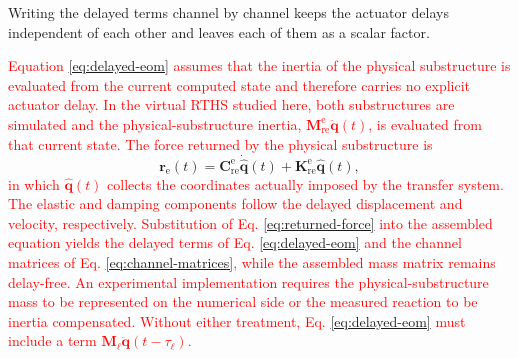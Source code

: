 \documentclass[11pt,a4paper]{article}
\numberwithin{equation}{section}
\newcommand{\rev}[1]{\textcolor{red}{#1}}
\begin{document}
Writing the delayed terms channel by channel keeps the actuator delays independent of each other and leaves each of them as a scalar factor.

\rev{Equation \eqref{eq:delayed-eom} assumes that the inertia of the physical substructure is evaluated from the current computed state and therefore carries no explicit actuator delay. In the virtual RTHS studied here, both substructures are simulated and the physical-substructure inertia, \(\mathbf{M}_{\mathrm{re}}^{\mathrm{e}}\ddot{\bm{q}}(t)\), is evaluated from that current state. The force returned by the physical substructure is}
\begin{equation}
	\bm{r}_{\mathrm{e}}(t)=\mathbf{C}_{\mathrm{re}}^{\mathrm{e}}\dot{\hat{\bm{q}}}(t)
		+\mathbf{K}_{\mathrm{re}}^{\mathrm{e}}\hat{\bm{q}}(t),
	\label{eq:returned-force}
\end{equation}
\rev{in which \(\hat{\bm{q}}(t)\) collects the coordinates actually imposed by the transfer system. The elastic and damping components follow the delayed displacement and velocity, respectively. Substitution of Eq. \eqref{eq:returned-force} into the assembled equation yields the delayed terms of Eq. \eqref{eq:delayed-eom} and the channel matrices of Eq. \eqref{eq:channel-matrices}, while the assembled mass matrix remains delay-free. An experimental implementation requires the physical-substructure mass to be represented on the numerical side or the measured reaction to be inertia compensated. Without either treatment, Eq. \eqref{eq:delayed-eom} must include a term \(\mathbf{M}_{\ell}\ddot{\bm{q}}(t-\tau_{\ell})\).}
\end{document}
